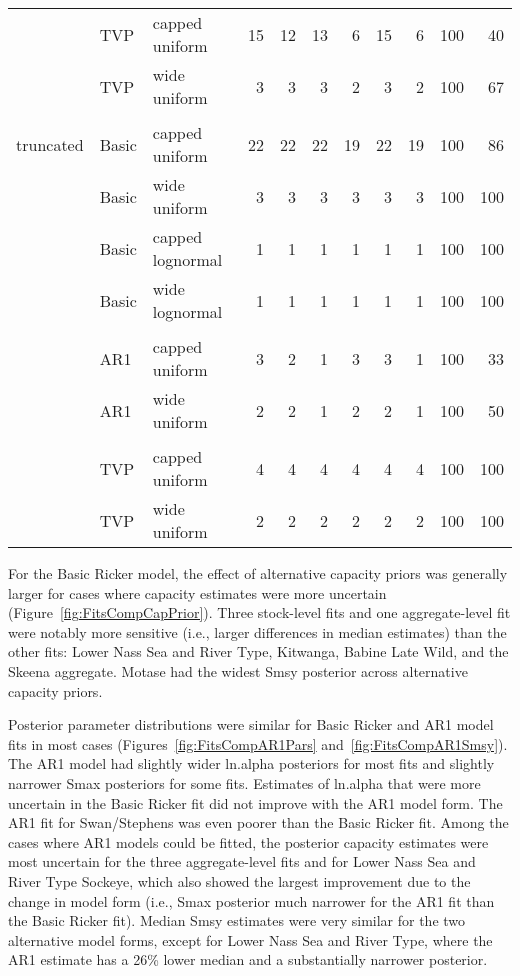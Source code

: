 \documentclass[french,11pt]{book}
\begin{document}
\begin{longtable}[t]{lllrrrrrrrr}
\cmidrule(l){2-11}\\  & TVP & capped uniform & 15 & 12 & 13 & 6 & 15 & 6 & 100 & 40\\  & TVP & wide uniform & 3 & 3 & 3 & 2 & 3 & 2 & 100 & 67\\
\midrule\\ truncated & Basic & capped uniform & 22 & 22 & 22 & 19 & 22 & 19 & 100 & 86\\  & Basic & wide uniform & 3 & 3 & 3 & 3 & 3 & 3 & 100 & 100\\  & Basic & capped lognormal & 1 & 1 & 1 & 1 & 1 & 1 & 100 & 100\\  & Basic & wide lognormal & 1 & 1 & 1 & 1 & 1 & 1 & 100 & 100\\
\cmidrule(l){2-11}\\  & AR1 & capped uniform & 3 & 2 & 1 & 3 & 3 & 1 & 100 & 33\\  & AR1 & wide uniform & 2 & 2 & 1 & 2 & 2 & 1 & 100 & 50\\
\cmidrule(l){2-11}\\  & TVP & capped uniform & 4 & 4 & 4 & 4 & 4 & 4 & 100 & 100\\  & TVP & wide uniform & 2 & 2 & 2 & 2 & 2 & 2 & 100 & 100\\* \end{longtable}

\endgroup{} \endgroup{}

For the Basic Ricker model, the effect of alternative capacity priors was generally larger for cases where capacity estimates were more uncertain (Figure~\ref{fig:FitsCompCapPrior}). Three stock-level fits and one aggregate-level fit were notably more sensitive (i.e., larger differences in median estimates) than the other fits: Lower Nass Sea and River Type, Kitwanga, Babine Late Wild, and the Skeena aggregate. Motase had the widest Smsy posterior across alternative capacity priors.

Posterior parameter distributions were similar for Basic Ricker and AR1 model fits in most cases (Figures~\ref{fig:FitsCompAR1Pars} and~\ref{fig:FitsCompAR1Smsy}). The AR1 model had slightly wider ln.alpha posteriors for most fits and slightly narrower Smax posteriors for some fits. Estimates of ln.alpha that were more uncertain in the Basic Ricker fit did not improve with the AR1 model form. The AR1 fit for Swan/Stephens was even poorer than the Basic Ricker fit. Among the cases where AR1 models could be fitted, the posterior capacity estimates were most uncertain for the three aggregate-level fits and for Lower Nass Sea and River Type Sockeye, which also showed the largest improvement due to the change in model form (i.e., Smax posterior much narrower for the AR1 fit than the Basic Ricker fit). Median Smsy estimates were very similar for the two alternative model forms, except for Lower Nass Sea and River Type, where the AR1 estimate has a 26\% lower median and a substantially narrower posterior.
\end{document}
